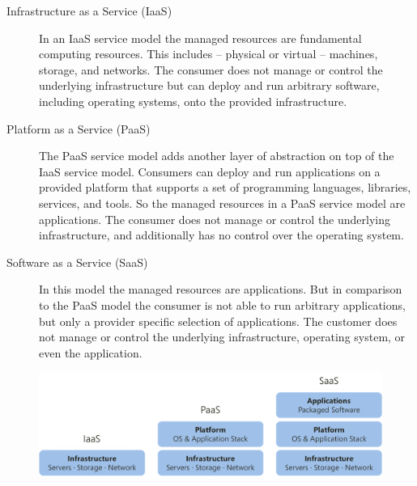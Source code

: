 \begin{description}
  \item[Infrastructure as a Service (IaaS)]
    In an IaaS service model the managed resources are fundamental computing
    resources. This includes -- physical or virtual -- machines, storage, and
    networks. The consumer does not manage or control the underlying
    infrastructure but can deploy and run arbitrary software, including
    operating systems, onto the provided infrastructure.

  \item[Platform as a Service (PaaS)]
    The PaaS service model adds another layer of abstraction on top of the IaaS
    service model. Consumers can deploy and run applications on a provided
    platform that supports a set of programming languages, libraries, services,
    and tools. So the managed resources in a PaaS service model are
    applications. The consumer does not manage or control the underlying
    infrastructure, and additionally has no control over the operating system.

  \item[Software as a Service (SaaS)]
    In this model the managed resources are applications. But in comparison to
    the PaaS model the consumer is not able to run arbitrary applications, but
    only a provider specific selection of applications. The customer does not
    manage or control the underlying infrastructure, operating system, or even
    the application.
\end{description}

\begin{figure}[ht]
  \centering
  \includegraphics[width=0.6\linewidth]{resources/distributed-computing-service-models.png}
\end{figure}

